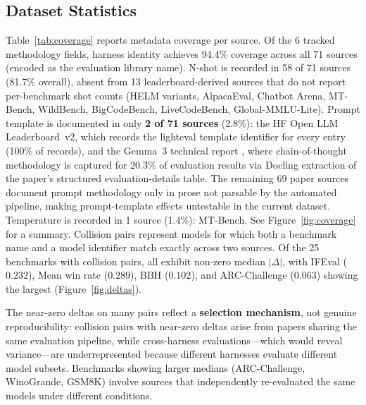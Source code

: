 \documentclass[11pt]{article}
\begin{document}
\subsection{Dataset Statistics}

Table~\ref{tab:coverage} reports metadata coverage per source.
Of the 6 tracked methodology fields, harness identity achieves 94.4\%
coverage across all 71 sources (encoded as the evaluation library name).
N-shot is recorded in 58 of 71 sources (81.7\% overall), absent from
13 leaderboard-derived sources that do not report per-benchmark shot counts
(HELM variants, AlpacaEval, Chatbot Arena, MT-Bench, WildBench,
BigCodeBench, LiveCodeBench, Global-MMLU-Lite).
Prompt template is documented in only \textbf{2 of 71 sources} (2.8\%):
the HF Open LLM Leaderboard~v2, which records the lighteval template
identifier for every entry (100\% of records), and the Gemma~3 technical report
\citep{team2025gemma3}, where chain-of-thought methodology is captured
for 20.3\% of evaluation results via Docling extraction of the paper's
structured evaluation-details table.
The remaining 69 paper sources document prompt methodology only in prose
not parsable by the automated pipeline,
making prompt-template effects untestable in the current dataset.
Temperature is recorded in 1 source (1.4\%): MT-Bench.
See Figure~\ref{fig:coverage} for a summary.
Collision pairs represent models for which both a benchmark name and
a model identifier match exactly across two sources.
Of the 25 benchmarks with collision pairs, all exhibit non-zero median $|\Delta|$,
with IFEval ($0.232$), Mean win rate ($0.289$), BBH ($0.102$),
and ARC-Challenge ($0.063$) showing the largest
(Figure~\ref{fig:deltas}).

The near-zero deltas on many pairs reflect a \textbf{selection mechanism},
not genuine reproducibility: collision pairs with near-zero deltas
arise from papers sharing the same evaluation pipeline, while
cross-harness evaluations---which would reveal variance---are
underrepresented because different harnesses evaluate different model subsets.
Benchmarks showing larger medians (ARC-Challenge, WinoGrande, GSM8K)
involve sources that independently re-evaluated the same
models under different conditions.
\end{document}
